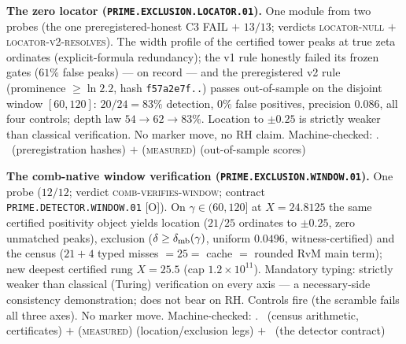 \par\smallskip\noindent\textbf{The zero locator
(\texttt{PRIME.EXCLUSION.LOCATOR.01}).}
One module from two probes (the one preregistered-honest C3 FAIL
$+$ $13/13$; verdicts \textsc{locator-null} $+$
\textsc{locator-v2-resolves}).  The width profile of the
certified tower peaks at true zeta ordinates
(explicit-formula redundancy); the v1 rule honestly failed its
frozen gates ($61\%$ false peaks) --- on record --- and the
preregistered v2 rule (prominence $\ge \ln 2.2$, hash
\texttt{f57a2e7f..}) passes out-of-sample on the disjoint window
$[60, 120]$: $20/24 = 83\%$ detection, $0\%$ false positives,
precision $0.086$, all four controls; depth law
$54 \to 62 \to 83\%$.  Location to $\pm 0.25$ is strictly weaker
than classical verification.  No marker move, no RH claim.
Machine-checked: .
\mE\ (preregistration hashes) $+$ (\textsc{measured})
(out-of-sample scores)
\par\smallskip


\par\smallskip\noindent\textbf{The comb-native window
verification (\texttt{PRIME.EXCLUSION.WINDOW.01}).}
One probe ($12/12$; verdict \textsc{comb-verifies-window};
contract \texttt{PRIME.DETECTOR.WINDOW.01} [O]).  On
$\gamma \in (60, 120]$ at $X = 24.8125$ the same certified
positivity object yields location ($21/25$ ordinates to
$\pm 0.25$, zero unmatched peaks), exclusion ($\delta \ge
\delta_{\rm mb}(\gamma)$, uniform $0.0496$, witness-certified)
and the census ($21 + 4$ typed misses $= 25 =$ cache $=$ rounded
RvM main term); new deepest certified rung $X = 25.5$ (cap
$1.2\times10^{11}$).  Mandatory typing: strictly weaker than
classical (Turing) verification on every axis --- a
necessary-side consistency demonstration; does not bear on RH.
Controls fire (the scramble fails all three axes).  No marker
move.
Machine-checked: .
\mE\ (census arithmetic, certificates) $+$ (\textsc{measured})
(location/exclusion legs) $+$ \mO\ (the detector contract)
\par\smallskip



